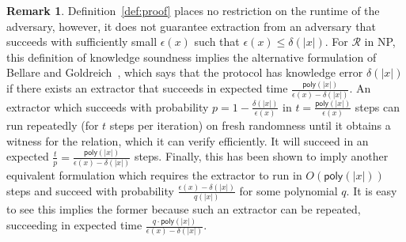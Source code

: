 \documentclass{article}
\theoremstyle{definition}
\newtheorem{remark}{Remark}
\begin{document}
\begin{remark} Definition~\ref{def:proof} places no restriction on the runtime of the adversary, however, it does not guarantee extraction from an adversary that succeeds with sufficiently small $\epsilon(x)$ such that $\epsilon(x) \leq  \delta(|x|)$. For $\mathcal{R}$ in NP, this definition of knowledge soundness implies the alternative formulation of Bellare and Goldreich~\cite{C:BelGol92}, which says that the protocol has knowledge error $\delta(|x|)$ if there exists an extractor that succeeds in expected time $\frac{\textsf{poly}(|x|)}{\epsilon(x) - \delta(|x|)}$. An extractor which succeeds with probability $p = 1 - \frac{\delta(|x|)}{\epsilon(x)}$ in $t = \frac{\mathsf{poly}(|x|)}{\epsilon(x)}$ steps can run repeatedly (for $t$ steps per iteration) on fresh randomness until it obtains a witness for the relation, which it can verify efficiently. It will succeed in an expected $\frac{t}{p} =  \frac{\textsf{poly}(|x|)}{\epsilon(x) - \delta(|x|)}$ steps. Finally, this has been shown to imply another equivalent formulation which requires the extractor to run in $O(\textsf{poly}(|x|))$ steps and succeed with probability $\frac{\epsilon(x) - \delta(|x|)}{q(|x|)}$ for some polynomial $q$. It is easy to see this implies the former because such an extractor can be repeated, succeeding in expected time $\frac{q \cdot \textsf{poly}(|x|)}{\epsilon(x) - \delta(|x|)}$. 	
\end{remark}



 
\end{document}
